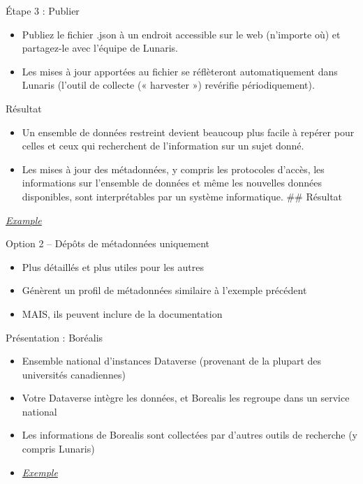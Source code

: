 \documentclass[
  ignorenonframetext,
]{beamer}
\providecommand{\tightlist}{%
  \setlength{\itemsep}{0pt}\setlength{\parskip}{0pt}}
\begin{document}
\begin{frame}{Étape 3 : Publier}
\label{uxe9tape-3-publier}
\begin{itemize}
\tightlist
\item
  Publiez le fichier .json à un endroit accessible sur le web (n'importe
  où) et partagez-le avec l'équipe de Lunaris.
\item
  Les mises à jour apportées au fichier se réflèteront automatiquement
  dans Lunaris (l'outil de collecte (« harvester ») revérifie
  périodiquement).
\end{itemize}
\end{frame}

\begin{frame}{Résultat}
\label{ruxe9sultat}
\begin{itemize}
\tightlist
\item
  Un ensemble de données restreint devient beaucoup plus facile à
  repérer pour celles et ceux qui recherchent de l'information sur un
  sujet donné.
\item
  Les mises à jour des métadonnées, y compris les protocoles d'accès,
  les informations sur l'ensemble de données et même les nouvelles
  données disponibles, sont interprétables par un système informatique.
  \#\# Résultat
\end{itemize}

\href{https://test.lunaris.ca/catalog/87dc478c-8d31-5d5f-8394-ce8c8d5f9448?locale=fr&q=&f\%5Bfrdr_origin_id\%5D\%5B\%5D=CRDCN}{\emph{Example}}
\end{frame}

\begin{frame}{Option 2 -- Dépôts de métadonnées uniquement}
\label{option-2-duxe9puxf4ts-de-muxe9tadonnuxe9es-uniquement}
\begin{itemize}
\tightlist
\item
  Plus détaillés et plus utiles pour les autres
\item
  Génèrent un profil de métadonnées similaire à l'exemple précédent
\item
  MAIS, ils peuvent inclure de la documentation
\end{itemize}
\end{frame}

\begin{frame}{Présentation : Boréalis}
\label{pruxe9sentation-boruxe9alis}
\begin{itemize}
\tightlist
\item
  Ensemble national d'instances Dataverse (provenant de la plupart des
  universités canadiennes)
\item
  Votre Dataverse intègre les données, et Borealis les regroupe dans un
  service national
\item
  Les informations de Borealis sont collectées par d'autres outils de
  recherche (y compris Lunaris)
\item
  \href{https://demo.borealisdata.ca/dataset.xhtml?persistentId=doi\%3A10.80240\%2FFK2\%2FDTCL3Z&version=DRAFT}{\emph{Exemple}}
\end{itemize}
\end{frame}
\end{document}
